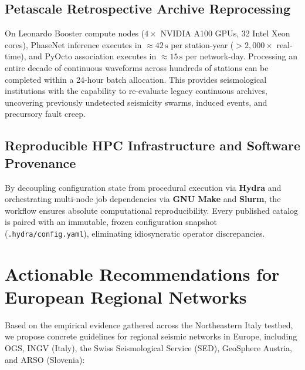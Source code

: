 \subsection{Petascale Retrospective Archive Reprocessing}
On Leonardo Booster compute nodes ($4 \times$ NVIDIA A100 \ac{GPU}s, 32
Intel Xeon cores), PhaseNet inference executes in $\approx 42\,\unit{\second}$
per station-year ($> 2{,}000 \times$ real-time),
and PyOcto association executes in $\approx 15\,\unit{\second}$ per
network-day. Processing an entire decade of continuous waveforms
across hundreds of stations can be completed within a 24-hour batch
allocation. This provides seismological institutions with the
capability to re-evaluate legacy continuous archives, uncovering
previously undetected seismicity swarms, induced events, and
precursory fault creep.

\subsection{Reproducible \ac{HPC} Infrastructure and Software Provenance}
By decoupling configuration state from procedural execution via
\textbf{Hydra} and orchestrating multi-node job dependencies via \textbf{GNU
Make} and \textbf{Slurm}, the workflow ensures absolute computational
reproducibility. Every published catalog is paired with an
immutable, frozen configuration snapshot
(\texttt{.hydra/config.yaml}), eliminating idiosyncratic operator
discrepancies.

\section{Actionable Recommendations for European Regional Networks}
\label{sec:conclusion_recommendations}

Based on the empirical evidence gathered across the Northeastern
Italy testbed, we propose concrete guidelines for regional seismic
networks in Europe, including \ac{OGS}, \ac{INGV} (Italy), the Swiss
Seismological Service (\ac{SED}), GeoSphere Austria, and \ac{ARSO} (Slovenia):

